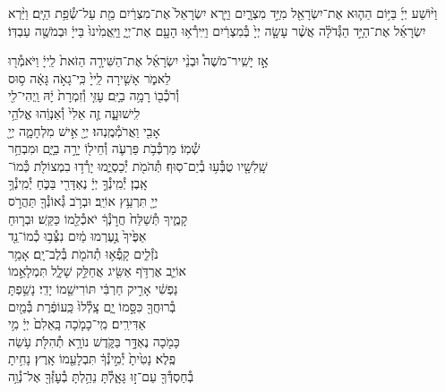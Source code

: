 \documentclass[twoside, openany, parskip=half, 11pt]{book}
\begin{document}
וַיּ֨וֹשַׁע
יְיָ֜ בַּיּ֥וֹם הַה֛וּא אֶת־יִשְׂרָאֵ֖ל מִיַּ֣ד מִצְרָ֑יִם וַיַּ֤רְא יִשְׂרָאֵל֙ אֶת־מִצְרַ֔יִם מֵ֖ת עַל־שְׂ֯פַ֥ת הַיָּֽם׃
וַיַּ֨רְא יִשְׂרָאֵ֜ל אֶת־הַיָּ֣ד הַגְּ֯דֹלָ֗ה אֲשֶׁ֨ר עָשָׂ֤ה יְיָ֙ בְּ֯מִצְרַ֔יִם וַיִּֽירְ֯א֥וּ הָעָ֖ם אֶת־יְיָ֑ וַיַּֽאֲמִ֙ינוּ֙ בַּייָ֔ וּבְמֹשֶׁ֖ה עַבְדּֽוֹ׃

אָ֣ז \hfill
יָשִֽׁיר־מֹשֶׁה֩ \hfill וּבְנֵ֨י \hfill יִשְׂרָאֵ֜ל \hfill אֶת־הַשִּׁירָ֤ה \hfill הַזֹּאת֙ \hfill לַֽייָ֔ \hfill וַיֹּאמְ֯ר֖וּ \\
לֵאמֹ֑ר \hfill אָשִׁ֤ירָה לַֽייָ֙ כִּֽי־גָאֹ֣ה גָּאָ֔ה \hfill ס֥וּס \\
וְ֯רֹכְ֯ב֖וֹ רָמָ֥ה בַיָּֽם׃ \hfill עׇזִּ֤י וְ֯זִמְרָת֙ יָ֔הּ וַֽיְהִי־לִ֖י \\
לִֽישׁוּעָ֑ה \hfill זֶ֤ה אֵלִי֙ וְ֯אַנְוֵ֔הוּ \hfill אֱלֹהֵ֥י \\
אָבִ֖י וַאֲרֹמְ֯מֶֽנְהוּ׃ \hfill יְיָ֖ אִ֣ישׁ מִלְחָמָ֑ה יְיָ֖ \\
שְׁ֯מֽוֹ׃ \hfill מַרְכְּ֯בֹ֥ת פַּרְעֹ֛ה וְ֯חֵיל֖וֹ יָרָ֣ה בַיָּ֑ם \hfill וּמִבְחַ֥ר\\
שָֽׁלִשָׁ֖יו טֻבְּ֯ע֥וּ בְ֯יַם־סֽוּף׃ \hfill תְּ֯הֹמֹ֖ת יְ֯כַסְיֻ֑מוּ יָרְ֯ד֥וּ בִמְצוֹלֹ֖ת כְּ֯מוֹ־\\
אָֽבֶן׃ \hfill יְ֯מִֽינְ֯ךָ֣ יְיָ֔ נֶאְדָּרִ֖י בַּכֹּ֑חַ \hfill יְ֯מִֽינְ֯ךָ֥ \\
יְיָ֖ תִּרְעַ֥ץ אוֹיֵֽב׃ \hfill וּבְרֹ֥ב גְּ֯אוֹנְ֯ךָ֖ תַּהֲרֹ֣ס \\
קָמֶ֑יךָ \hfill תְּ֯שַׁלַּח֙ חֲרֹ֣נְ֯ךָ֔ יֹאכְ֯לֵ֖מוֹ כַּקַּֽשׁ׃ \hfill וּבְר֤וּחַ \\
אַפֶּ֙יךָ֙ נֶ֣עֶרְמוּ מַ֔יִם \hfill נִצְּ֯ב֥וּ כְ֯מוֹ־נֵ֖ד \\
נֹזְ֯לִ֑ים \hfill קָֽפְ֯א֥וּ תְ֯הֹמֹ֖ת בְּ֯לֶב־יָֽם׃ \hfill אָמַ֥ר \\
אוֹיֵ֛ב אֶרְדֹּ֥ף אַשִּׂ֖יג \hfill אֲחַלֵּ֣ק שָׁלָ֑ל תִּמְלָאֵ֣מוֹ \\
נַפְשִׁ֔י \hfill אָרִ֣יק חַרְבִּ֔י תּוֹרִישֵׁ֖מוֹ יָדִֽי׃ \hfill נָשַׁ֥פְתָּ \\
בְ֯רוּחֲךָ֖ כִּסָּ֣מוֹ יָ֑ם \hfill צָֽלְ֯לוּ֙ כַּֽעוֹפֶ֔רֶת בְּ֯מַ֖יִם \\
אַדִּירִֽים׃ \hfill מִֽי־כָמֹ֤כָה בָּֽאֵלִם֙ יְיָ֔ \hfill מִ֥י \\
כָּמֹ֖כָה נֶאְדָּ֣ר בַּקֹּ֑דֶשׁ \hfill נוֹרָ֥א תְ֯הִלֹּ֖ת עֹ֥שֵׂה \\
פֶֽלֶא׃ \hfill נָטִ֙יתָ֙ יְ֯מִ֣ינְ֯ךָ֔ תִּבְלָעֵ֖מוֹ אָֽרֶץ׃ \hfill נָחִ֥יתָ \\
בְ֯חַסְדְּ֯ךָ֖ עַם־ז֣וּ גָּאָ֑לְ֯תָּ \hfill נֵהַ֥לְתָּ בְ֯עׇזְּ֯ךָ֖ אֶל־נְ֯וֵ֥ה \\
\end{document}
